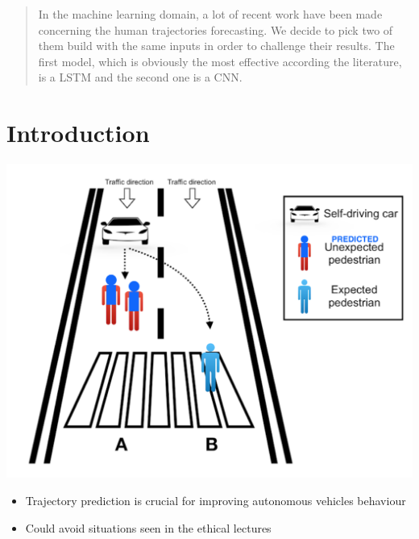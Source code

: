 \documentclass[a0,portrait]{a0poster}
\begin{document}
\begin{multicols}{2} %


\color{Navy} %

\begin{abstract}

In the machine learning domain, a lot of recent work have been made concerning the human trajectories forecasting. We decide to pick two of them build with the same inputs in order to challenge their results. The first model, which is obviously the most effective according the literature, is a LSTM and the second one is a CNN.

\end{abstract}


\color{SaddleBrown} %

\section*{Introduction}

\begin{minipage}[]{0.5\linewidth}
\centerline {\includegraphics[scale = 0.5]{figure/intro2}}
\end{minipage}
%
\begin{minipage}[]{0.5\linewidth}
\centering
\begin{itemize}
\item Trajectory prediction is crucial for improving autonomous vehicles behaviour
\item Could avoid situations seen in the ethical lectures
\end{itemize}
\end{minipage}



\end{multicols}
\end{document}

